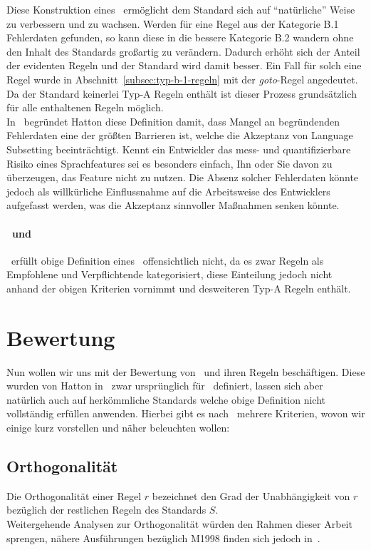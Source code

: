 \documentclass[a4paper,UKenglish,cleveref, autoref]{templates/lipics-v2019}
\begin{document}
    Diese Konstruktion eines \slss\ ermöglicht dem Standard sich auf \enquote{natürliche} Weise zu verbessern und zu wachsen.
    Werden für eine Regel aus der Kategorie B.1 Fehlerdaten gefunden, so kann diese in die bessere Kategorie
    B.2 wandern ohne den Inhalt des Standards großartig zu verändern.
    Dadurch erhöht sich der Anteil der evidenten Regeln und der Standard wird damit besser.
    Ein Fall für solch eine Regel wurde in Abschnitt~\ref{subsec:typ-b-1-regeln} mit der \textit{goto}-Regel angedeutet.
    Da der Standard keinerlei Typ-A Regeln enthält ist dieser Prozess grundsätzlich für alle enthaltenen Regeln möglich.\\
    In~\cite{hatton2004safer} begründet Hatton diese Definition damit, dass Mangel an begründenden Fehlerdaten eine der
    größten Barrieren ist, welche die Akzeptanz von Language Subsetting beeinträchtigt.
    Kennt ein Entwickler das mess- und quantifizierbare Risiko eines Sprachfeatures sei es besonders einfach, Ihn oder Sie
    davon zu überzeugen, das Feature nicht zu nutzen.
    Die Absenz solcher Fehlerdaten könnte jedoch als willkürliche Einflussnahme auf die Arbeitsweise des Entwicklers
    aufgefasst werden, was die Akzeptanz sinnvoller Maßnahmen senken könnte.\\

    \paragraph*{\slss\ und \misra}
    \misra\ erfüllt obige Definition eines \slss\ offensichtlich nicht, da es zwar Regeln als Empfohlene und Verpflichtende
    kategorisiert, diese Einteilung jedoch nicht anhand der obigen Kriterien vornimmt und desweiteren Typ-A Regeln enthält.
    
    \section{Bewertung}
    \label{sec:bewertung}

    Nun wollen wir uns mit der Bewertung von \sqss\ und ihren Regeln beschäftigen.
    Diese wurden von Hatton in~\cite{hatton2004safer} zwar ursprünglich für \slss\ definiert, lassen sich aber natürlich
    auch auf herkömmliche Standards welche obige Definition nicht vollständig erfüllen anwenden.
    Hierbei gibt es nach~\cite{hatton2004safer} mehrere Kriterien, wovon wir einige kurz vorstellen und näher beleuchten wollen:

    \subsection{Orthogonalität}
    \label{subsec:orthogonalität}
    Die Orthogonalität einer Regel $r$ bezeichnet den Grad der Unabhängigkeit von $r$ bezüglich der restlichen Regeln
    des Standards $S$.\\
    Weitergehende Analysen zur Orthogonalität würden den Rahmen dieser Arbeit sprengen, nähere Ausführungen bezüglich
    M1998 finden sich jedoch in~\cite{hatton2004safer}.
\end{document}
